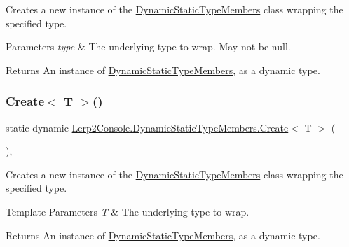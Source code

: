 Creates a new instance of the \hyperlink{class_lerp2_console_1_1_dynamic_static_type_members}{Dynamic\+Static\+Type\+Members} class wrapping the specified type. 


\begin{DoxyParams}{Parameters}
{\em type} & The underlying type to wrap. May not be {\ttfamily null}.\\
\hline
\end{DoxyParams}
\begin{DoxyReturn}{Returns}
An instance of \hyperlink{class_lerp2_console_1_1_dynamic_static_type_members}{Dynamic\+Static\+Type\+Members}, as a dynamic type.
\end{DoxyReturn}
\mbox{\label{class_lerp2_console_1_1_dynamic_static_type_members_af3790b4348441f2edeb40dbfe7207af5}} 
\subsubsection{\texorpdfstring{Create$<$ T $>$()}{Create< T >()}}
{\footnotesize\ttfamily static dynamic \hyperlink{class_lerp2_console_1_1_dynamic_static_type_members_a28487e53e21f9e2ea239255fc75585d2}{Lerp2\+Console.\+Dynamic\+Static\+Type\+Members.\+Create}$<$ T $>$ (\begin{DoxyParamCaption}{ }\end{DoxyParamCaption})\hspace{0.3cm}{\ttfamily [inline]}, {\ttfamily [static]}}



Creates a new instance of the \hyperlink{class_lerp2_console_1_1_dynamic_static_type_members}{Dynamic\+Static\+Type\+Members} class wrapping the specified type. 


\begin{DoxyTemplParams}{Template Parameters}
{\em T} & The underlying type to wrap.\\
\hline
\end{DoxyTemplParams}
\begin{DoxyReturn}{Returns}
An instance of \hyperlink{class_lerp2_console_1_1_dynamic_static_type_members}{Dynamic\+Static\+Type\+Members}, as a dynamic type.
\end{DoxyReturn}
\mbox{\label{class_lerp2_console_1_1_dynamic_static_type_members_a4bc97855ed3d800087cbc6e186bc67f6}} 
